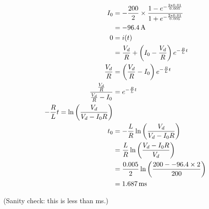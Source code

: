\subsection{}

\begin{center}



%

\end{center}


\begin{align*}
I_0 & = -\frac{200}{2} \times \frac{1-e^{-\frac{2*0.01}{0.005}}}{1+e^{-\frac{2*0.01}{0.005}}} \\
    & = \unit[-96.4]{A} \\
0   & = i(t) \\
    & = \frac{V_d}{R} + \left( I_0 - \frac{V_d}{R}\right) e^{-\frac{R}{L}t} \\
\frac{V_d}{R} & = \left(\frac{V_d}{R} - I_0\right) e^{-\frac{R}{L} t} \\
\frac{\frac{V_d}{R}}{\frac{V_d}{R}-I_0} & = e^{-\frac{R}{L}t} \\
-\frac{R}{L}t = \ln\left(\frac{V_d}{V_d - I_0 R}\right) \\
t_0 & = -\frac{L}{R} \ln \left( \frac{V_d}{V_d-I_0R}\right) \\
    & = \frac{L}{R} \ln \left( \frac{V_d-I_0R}{V_d}\right) \\
    & = \frac{0.005}{2} \ln \left( \frac{200--96.4\times 2}{200}\right) \\
    & = \unit[1.687]{ms}
\end{align*}

(Sanity check: this is less than \unit[10]{ms}.)

